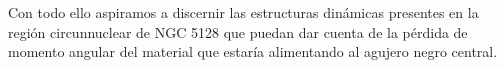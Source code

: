 \documentclass[baaa]{baaa}
\begin{document}
Con todo ello aspiramos a discernir las estructuras dinámicas presentes en la región circunnuclear de NGC 5128 que puedan dar cuenta de la pérdida de momento angular del material que estaría alimentando al agujero negro central.







\small

 
\end{document}
